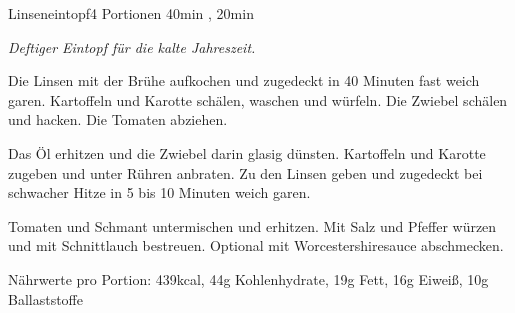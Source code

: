 \documentclass[../recipe-collections/cooking.tex]{subfiles}
\begin{document}
\begin{recipe}{Linseneintopf}{4 Portionen }{40min , 20min }

  \freeform{}\textit{Deftiger Eintopf für die kalte Jahreszeit.}


  Die Linsen mit der Brühe aufkochen und zugedeckt in 40 Minuten fast weich garen.
  Kartoffeln und Karotte schälen, waschen und würfeln.
  Die Zwiebel schälen und hacken.
  Die Tomaten abziehen.


  Das Öl erhitzen und die Zwiebel darin glasig dünsten.
  Kartoffeln und Karotte zugeben und unter Rühren anbraten.
  Zu den Linsen geben und zugedeckt bei schwacher Hitze in 5 bis 10 Minuten weich garen.


  Tomaten und Schmant untermischen und erhitzen.
  Mit Salz und Pfeffer würzen und mit Schnittlauch bestreuen.
  Optional mit Worcestershiresauce abschmecken.

  \freeform{}\hrulefill{}

  \freeform{}
  Nährwerte pro Portion: 439kcal, 44g Kohlenhydrate, 19g Fett, 16g Eiweiß, 10g Ballaststoffe

\end{recipe}
\end{document}
